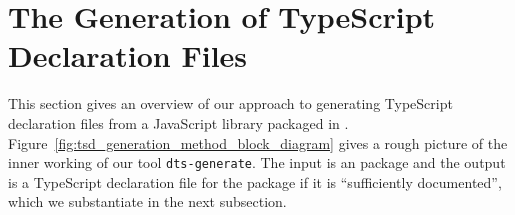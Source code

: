 \documentclass[sigplan,screen]{acmart}
\newcommand{\figref}[1]{Figure~\ref{#1}}
\begin{document}











\section{The Generation of TypeScript Declaration Files}
\label{sec:gener-typescr-decl}
This section gives an overview of our approach to generating
TypeScript declaration files from a JavaScript library packaged in
\NPM. \figref{fig:tsd_generation_method_block_diagram} gives a rough
picture of the inner working of our tool \texttt{dts-generate}. The
input is an \NPM{} package and the output is a TypeScript declaration
file for the package if it is ``sufficiently documented'', which we
substantiate in the next subsection.
\end{document}
